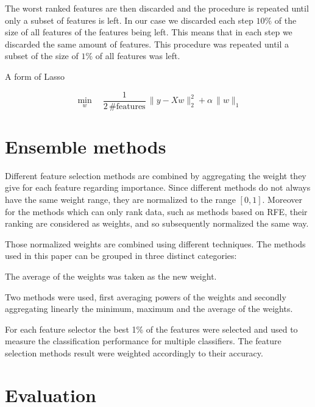 \documentclass[twoside,11pt]{article}
\begin{document}
The worst ranked features are then discarded and the procedure is repeated until only a subset of features is left.
In our case we discarded each step $10\%$ of the size of all features of the features being left. This means that
in each step we discarded the same amount of features. This procedure was repeated until a subset of the size
of $1\%$ of all features was left.

A form of Lasso

\begin{equation}
  \min_w \quad \frac1{2 \, \textrm{\#features}} \, \|y - Xw\|^2_2 + \alpha \, \|w\|_1
\end{equation}


\section{Ensemble methods}

Different feature selection methods are combined by aggregating the weight they give for each feature regarding importance. Since different methods do not always have the same weight range, they are normalized to the range $[0,1]$. Moreover for the methods which can only rank data, such as methods based on RFE, their ranking are considered as weights, and so subsequently normalized the same way. 

Those normalized weights are combined using different techniques. The methods used in this paper can be grouped in three distinct categories: 

\begin{description}[align=left]
\item [Linear aggregation :] The average of the weights was taken as the new weight.
\item [Non-linear aggregation :] Two methods were used, first averaging powers of the weights and secondly aggregating linearly the minimum, maximum and the average of the weights.
\item [Performance related aggregation :] For each feature selector the best 1\% of the features were selected and used to measure the classification performance for multiple classifiers. The feature selection methods result were weighted accordingly to their accuracy.
\end{description}

\section{Evaluation}
\end{document}

